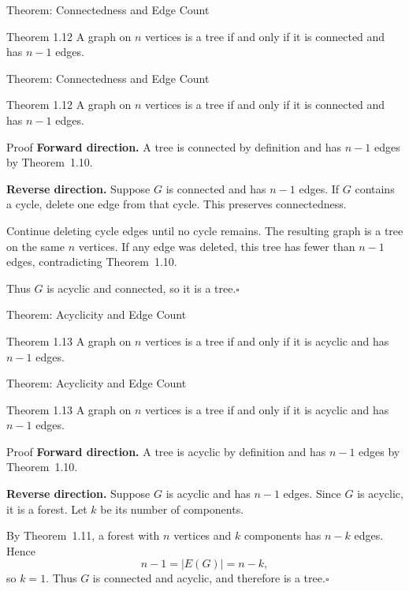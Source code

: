 \documentclass[aspectratio=169,11pt]{beamer}
\begin{document}
\begin{frame}[t]{Theorem: Connectedness and Edge Count}
\large
\begin{block}{Theorem 1.12}
A graph on $n$ vertices is a tree if and only if it is connected and has $n-1$ edges.
\end{block}
\end{frame}

\begin{frame}[t]{Theorem: Connectedness and Edge Count}
\large
\begin{block}{Theorem 1.12}
A graph on $n$ vertices is a tree if and only if it is connected and has $n-1$ edges.
\end{block}
\begin{block}{Proof}
\normalsize
\textbf{Forward direction.} A tree is connected by definition and has $n-1$ edges by Theorem~1.10.
\par\medskip
\textbf{Reverse direction.} Suppose $G$ is connected and has $n-1$ edges. If $G$ contains a cycle, delete one edge from that cycle. This preserves connectedness.
\par\medskip
Continue deleting cycle edges until no cycle remains. The resulting graph is a tree on the same $n$ vertices. If any edge was deleted, this tree has fewer than $n-1$ edges, contradicting Theorem~1.10.
\par\medskip
Thus $G$ is acyclic and connected, so it is a tree.\hfill$\square$
\end{block}
\end{frame}

\begin{frame}[t]{Theorem: Acyclicity and Edge Count}
\large
\begin{block}{Theorem 1.13}
A graph on $n$ vertices is a tree if and only if it is acyclic and has $n-1$ edges.
\end{block}
\end{frame}

\begin{frame}[t]{Theorem: Acyclicity and Edge Count}
\large
\begin{block}{Theorem 1.13}
A graph on $n$ vertices is a tree if and only if it is acyclic and has $n-1$ edges.
\end{block}
\begin{block}{Proof}
\normalsize
\textbf{Forward direction.} A tree is acyclic by definition and has $n-1$ edges by Theorem~1.10.
\par\medskip
\textbf{Reverse direction.} Suppose $G$ is acyclic and has $n-1$ edges. Since $G$ is acyclic, it is a forest. Let $k$ be its number of components.
\par\medskip
By Theorem~1.11, a forest with $n$ vertices and $k$ components has $n-k$ edges. Hence
\[
n-1=|E(G)|=n-k,
\]
so $k=1$. Thus $G$ is connected and acyclic, and therefore is a tree.\hfill$\square$
\end{block}
\end{frame}
\end{document}
